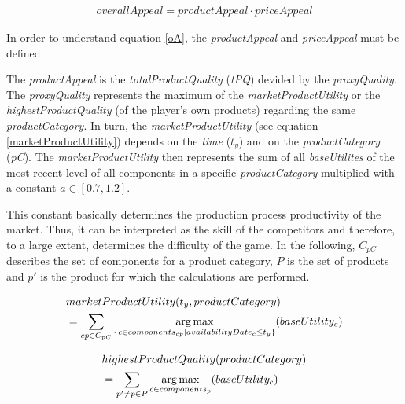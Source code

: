 \begin{equation}
\label{oA}
\begin{aligned}
overallAppeal = productAppeal \cdot priceAppeal
\end{aligned}
\end{equation}

In order to understand equation \ref{oA}, the \textit{productAppeal} and \textit{priceAppeal} must be defined.

The \textit{productAppeal} is the \textit{totalProductQuality} (\textit{\gls{tPQ}}) devided by the \textit{proxyQuality}.
The \textit{proxyQuality} represents the maximum of the \textit{marketProductUtility} or the \textit{highestProductQuality} (of the player's own products) regarding the same \textit{productCategory}.
In turn, the \textit{marketProductUtility} (see equation \ref{marketProductUtility}) depends on the \textit{time} ($t_y$) and on the \textit{productCategory} (\textit{\gls{pC}}). The \textit{marketProductUtility} then represents the sum of all \textit{baseUtilites} of the most recent level of all components in a specific \textit{productCategory} multiplied with a constant $a \in [0.7, 1.2]$. 

This constant basically determines the production process productivity of the market. Thus, it can be interpreted as the skill of the competitors and therefore, to a large extent, determines the difficulty of the game. In the following, $C_{pC}$ describes the set of components for a product category, $P$ is the set of products and $p'$ is the product for which the calculations are performed.

\begin{equation}
\label{marketProductUtility}
\begin{aligned}
    & marketProductUtility(t_y, productCategory) \\
    & = \sum_{cp \in C_{pC}} \operatorname*{arg\,max}\limits_{\{c \in components_{cp}| availabilityDate_c \leq t_y\}}(baseUtility_c)\\
\end{aligned}    
\end{equation}

\begin{equation}
\label{highestProductQuality}
\begin{aligned}
    & highestProductQuality(productCategory) \\
    & = \sum_{p' \neq p \in P} \operatorname*{arg\,max}\limits_{c \in components_p}(baseUtility_c) \\
\end{aligned}    
\end{equation}

